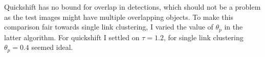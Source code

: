 Quickshift has no bound for overlap in detections, which should not be a problem as the test images might have multiple overlapping objects. To make this comparison fair towards single link clustering, I varied the value of $\theta_p$ in the latter algorithm. For quickshift I settled on $\tau = 1.2$, for single link clustering $\theta_p = 0.4$ seemed ideal.

% 
% 
% 
% 
% 


